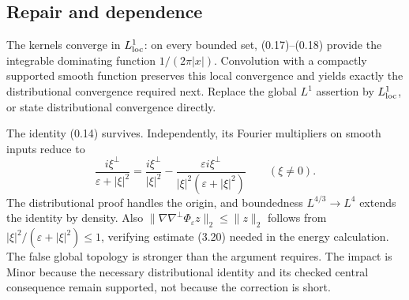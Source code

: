 \documentclass[10pt]{article}
\begin{document}
\subsection*{Repair and dependence}
The kernels converge in \(L^1_{\rm loc}\): on every bounded set, (0.17)–(0.18) provide the integrable dominating function \(1/(2\pi|x|)\). Convolution with a compactly supported smooth function preserves this local convergence and yields exactly the distributional convergence required next. Replace the global \(L^1\) assertion by \(L^1_{\rm loc}\), or state distributional convergence directly.\par
The identity (0.14) survives. Independently, its Fourier multipliers on smooth inputs reduce to \[\frac{i\xi^\perp}{\varepsilon+|\xi|^2}
 =
 \frac{i\xi^\perp}{|\xi|^2}
 -\frac{\varepsilon i\xi^\perp}{|\xi|^2(\varepsilon+|\xi|^2)}
 \qquad(\xi\ne0).\] The distributional proof handles the origin, and boundedness \(L^{4/3}\to L^4\) extends the identity by density. Also \(\|\nabla\nabla^\perp\Phi_\varepsilon z\|_2\le\|z\|_2\) follows from \(|\xi|^2/(\varepsilon+|\xi|^2)\le1\), verifying estimate (3.20) needed in the energy calculation. The false global topology is stronger than the argument requires. The impact is Minor because the necessary distributional identity and its checked central consequence remain supported, not because the correction is short.\par
\end{document}
